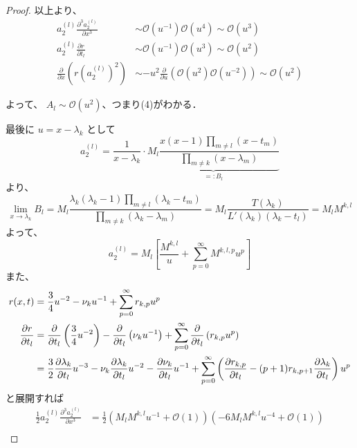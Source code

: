 \begin{story}
\begin{proof}
以上より、
\begin{align*}
a_2^{(l)} \frac{\partial^3 a_2^{(l)}}{\partial x^3} &\sim \mathcal{O}(u^{-1}) \mathcal{O}(u^4) \sim \mathcal{O}(u^3) \\
a_2^{(l)} \frac{\partial r}{\partial t_l} &\sim \mathcal{O}(u^{-1}) \mathcal{O}(u^3) \sim \mathcal{O}(u^2) \\
\frac{\partial}{\partial x} \left( r (a_2^{(l)})^2 \right) &\sim -u^2 \frac{\partial}{\partial u} \left( \mathcal{O}(u^2) \mathcal{O}(u^{-2}) \right) \sim \mathcal{O}(u^2)
\end{align*}

よって、 $A_l \sim \mathcal{O}(u^2)$、つまり(4)がわかる．

最後に $u=x-\lambda_k$ として
\begin{equation*}
    a_2^{(l)} = \frac{1}{x-\lambda_k} \cdot \underbrace{M_l \frac{x(x-1) \prod_{m \neq l} (x-t_m)}{\prod_{m \neq k} (x-\lambda_m)}}_{=: B_l}
\end{equation*}
より、
\begin{equation*}
    \lim_{x \to \lambda_k} B_l = M_l \frac{\lambda_k(\lambda_k-1) \prod_{m \neq l} (\lambda_k-t_m)}{\prod_{m \neq k} (\lambda_k-\lambda_m)} = M_l \frac{T(\lambda_k)}{L'(\lambda_k)(\lambda_k-t_l)} = M_l M^{k,l}
\end{equation*}
よって、
\begin{equation*}
    a_2^{(l)} = M_l \left[ \frac{M^{k,l}}{u} + \sum_{p=0}^\infty M^{k,l,p} u^p \right]
\end{equation*}
また、
\begin{align*}
    r(x,t) &= \frac{3}{4} u^{-2} - \nu_k u^{-1} + \sum_{p=0}^\infty r_{k,p} u^p \\
    \frac{\partial r}{\partial t_l} &= \frac{\partial}{\partial t_l} \left( \frac{3}{4} u^{-2} \right) - \frac{\partial}{\partial t_l} \left( \nu_k u^{-1} \right) + \sum_{p=0}^\infty \frac{\partial}{\partial t_l} \left( r_{k,p} u^p \right) \notag \\
    &= \frac{3}{2} \frac{\partial \lambda_k}{\partial t_l} u^{-3} - \nu_k \frac{\partial \lambda_k}{\partial t_l} u^{-2} - \frac{\partial \nu_k}{\partial t_l} u^{-1} + \sum_{p=0}^\infty \left( \frac{\partial r_{k,p}}{\partial t_l} - (p+1) r_{k,p+1} \frac{\partial \lambda_k}{\partial t_l} \right) u^p
\end{align*}
と展開すれば
\begin{align*}
    \frac{1}{2} a_2^{(l)} \frac{\partial^3 a_2^{(l)}}{\partial x^3} &= \frac{1}{2} \left( M_l M^{k,l} u^{-1} + \mathcal{O}(1) \right) \left( -6 M_l M^{k,l} u^{-4} + \mathcal{O}(1) \right) \\

\end{align*}
\end{proof}
\end{story}
